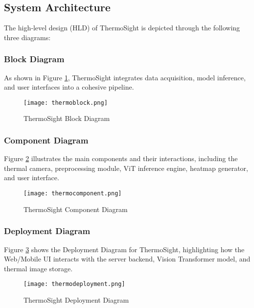 \subsection{System Architecture}
The high‐level design (HLD) of ThermoSight is depicted through the following three diagrams:

\subsubsection{Block Diagram}

As shown in Figure \ref{fig:ts_block}, ThermoSight integrates data acquisition, model inference, and user interfaces into a cohesive pipeline.

\begin{figure}[H]
    \centering
    \texttt{[image: thermoblock.png]}
    \caption{ThermoSight Block Diagram}
    \label{fig:ts_block}
\end{figure}
\medskip

\subsubsection{Component Diagram}

Figure \ref{fig:ts_component} illustrates the main components and their interactions, including the thermal camera, preprocessing module, ViT inference engine, heatmap generator, and user interface.

\begin{figure}[H]
    \centering
    \texttt{[image: thermocomponent.png]}
    \caption{ThermoSight Component Diagram}
    \label{fig:ts_component}
\end{figure}
\medskip

\subsubsection{Deployment Diagram}

Figure \ref{fig:ts_deployment} shows the Deployment Diagram for ThermoSight, highlighting how the Web/Mobile UI interacts with the server backend, Vision Transformer model, and thermal image storage.

\begin{figure}[H]
    \centering
    \texttt{[image: thermodeployment.png]}
    \caption{ThermoSight Deployment Diagram}
    \label{fig:ts_deployment}
\end{figure}
